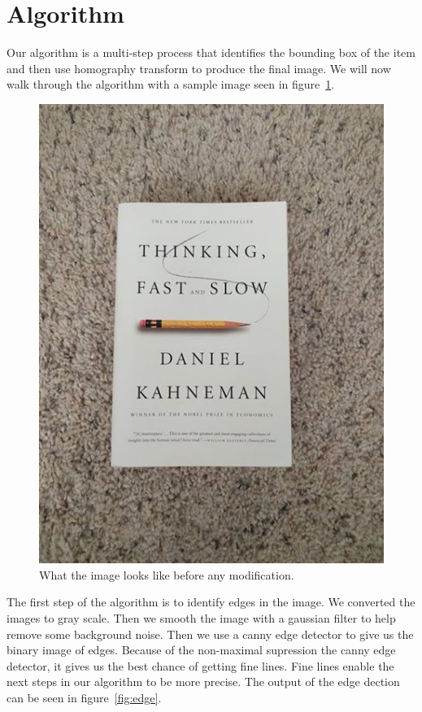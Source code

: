 \section{Algorithm}
\label{sec:algorithm}

Our algorithm is a multi-step process that identifies the bounding box of the item and then use homography transform to produce the final image.
We will now walk through the algorithm with a sample image seen in figure~\ref{fig:normal}.

\begin{figure}[t]
\begin{center}
   \includegraphics[width=0.8\linewidth]{figures/normal.jpg}
\end{center}
\caption{What the image looks like before any modification.}
\label{fig:normal}
\end{figure}

The first step of the algorithm is to identify edges in the image.
We converted the images to gray scale.
Then we smooth the image with a gaussian filter to help remove some background noise.
Then we use a canny edge detector to give us the binary image of edges.
Because of the non-maximal supression the canny edge detector, it gives us the best chance of getting fine lines.
Fine lines enable the next steps in our algorithm to be more precise.
The output of the edge dection can be seen in figure~\ref{fig:edge}.

